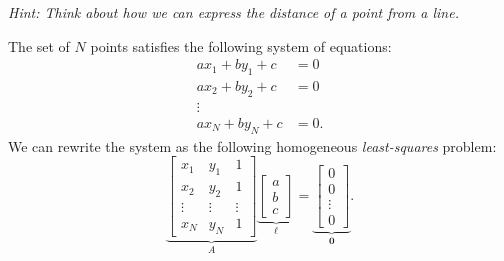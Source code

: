 \begin{problem}
\begin{enumroman}
      \step
      \emph{Hint: Think about how we can express the distance of a
      point from a line.}
      \begin{answer}
        The set of $N$ points satisfies the following system of equations:
        \begin{align*}
          ax_1 + by_1 + c &= 0 \\
          ax_2 + by_2 + c &= 0 \\
          \vdots \\
          ax_N + by_N + c &= 0.
        \end{align*}
        We can rewrite the system as the following homogeneous
        \emph{least-squares} problem:
        \[
          \underbrace{\begin{bmatrix}
            x_1 & y_1 & 1 \\
            x_2 & y_2 & 1 \\
            \vdots & \vdots & \vdots \\
            x_N & y_N & 1
          \end{bmatrix}}_{A}
          \underbrace{\begin{bmatrix}
            a \\
            b \\
            c
          \end{bmatrix}}_{\ell}
          =
          \underbrace{\begin{bmatrix}
            0 \\
            0 \\
            \vdots \\
            0
          \end{bmatrix}}_{\mathbf{0}}.
        \]


\end{answer}
\end{enumroman}
\end{problem}
